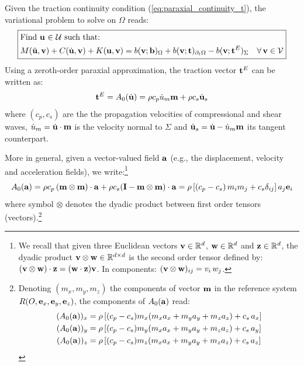 \documentclass{report}
\newcommand{\bb}{\textbf{b}}
\newcommand{\bu}{\textbf{u}}
\newcommand{\bv}{\textbf{v}}
\newcommand{\bt}{\boldsymbol t}
\newcommand{\bz}{\textbf{z}}
\def\ba{{\bf{a}}}
\def\bb{{\bf{b}}}
\def\be{{\bf e}}
\def\be{{\bf{e}}}
\def\bI{{{\bf{I}}}}
\def\bm{{\bf m}}
\def\bt{{\bf t}}
\def\bu{{\bf{u}}}
\def\bv{{\bf{v}}}
\def\bw{{\bf w}}
\def\bz{{\bf z}}
\begin{document}
Given the traction continuity condition (\ref{eq:paraxial_continuity_t}),
the variational problem to solve on $\Omega$ reads:
\begin{equation}
\boxed{\begin{aligned} & \text{Find \ensuremath{\bu} \ensuremath{\in} \ensuremath{\mathcal{U}} such that: }\\
 & M(\ddot{\bu},\bv)+C(\dot{\bu},\bv)+K(\bu,\bv)=b(\bv;\bb)_{\Omega}+b(\bv;\bt)_{\partial_{t}\Omega}-b(\bv;\bt^{E})_{\Sigma}\quad\forall\,\bv\in\mathcal{V}
\end{aligned}
}\label{eq:paraxial_varf_1}
\end{equation}
Using a zeroth-order paraxial approximation, the traction vector $\bt^{E}$ can be written as:
\begin{equation}
\bt^{E}=A_{0}(\dot{\bu}) = \rho c_p \dot{u}_m \bm + \rho c_s \dot{\bu}_s
\label{eq:paraxial_lin_form}
\end{equation}
where $(c_p,c_s)$ are the the propagation velocities of compressional and shear waves, $\dot{u}_m = \dot{\bu} \cdot \bm$ is the velocity normal to $\Sigma$ and  $\dot{\bu}_s = \dot{\bu} - \dot{u}_m \bm$ its tangent counterpart.

More in general, given a vector-valued field $\ba$ (e.g., the displacement, velocity and acceleration fields), we write:\footnote{We recall that given three Euclidean vectors $\bv \in \mathbb{R}^d$, $\bw\in \mathbb{R}^d$ and $\bz\in \mathbb{R}^d$, the dyadic product $\bv \otimes \bw \in \mathbb{R}^{d\times d}$ is the second order tensor defined by: $(\bv \otimes \bw)\cdot \bz = (\bw\cdot \bz) \bv $. In components: $(\bv \otimes \bw)_{ij}=v_i\,w_j$.}
\begin{equation}
    A_{0}(\ba) = \rho c_p \, (\bm \otimes \bm) \cdot \ba + \rho c_s ({\bI} - \bm \otimes \bm) \cdot \ba = \rho \left[ (c_p - c_s)\, m_i m_j + c_s \delta_{ij} \right] a_j \be_i
\end{equation}
where symbol $\otimes$ denotes the dyadic product between first order tensors (vectors).\footnote{Denoting $(m_x,m_y,m_z)$ the components of vector $\bm$ in the reference system $R(O,\be_x,\be_y,\be_z)$, the components of $A_{0}(\ba)$ read:
\begin{align}
    (A_{0}(\ba))_x & = \rho \left[(c_p-c_s) m_x (m_x a_x + m_y a_y + m_z a_z) + c_s\,a_x \right] \\
    (A_{0}(\ba))_y & =  \rho \left[(c_p-c_s) m_y (m_x a_x + m_y a_y + m_z a_z) + c_s\,a_y \right] \\
    (A_{0}(\ba))_z & =  \rho \left[(c_p-c_s) m_z (m_x a_x + m_y a_y + m_z a_z) + c_s\,a_z \right]
\end{align}}
\end{document}
